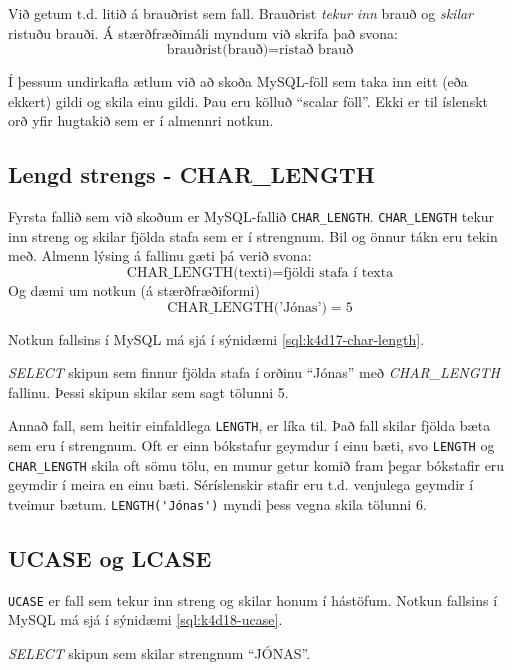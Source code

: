 Við getum t.d. litið á brauðrist sem fall. Brauðrist \emph{tekur inn} brauð og \emph{skilar} ristuðu brauði. Á stærðfræðimáli myndum við skrifa það svona:
\[
\text{brauðrist(brauð)} = \text{ristað brauð}
\]

Í þessum undirkafla ætlum við að skoða MySQL-föll sem taka inn eitt (eða ekkert) gildi og skila einu gildi. Þau eru kölluð ``scalar föll''. Ekki er til íslenskt orð yfir hugtakið sem er í almennri notkun.
\subsection{Lengd strengs - CHAR\_LENGTH}
Fyrsta fallið sem við skoðum er MySQL-fallið \verb|CHAR_LENGTH|. \verb|CHAR_LENGTH| tekur inn streng og skilar fjölda stafa sem er í strengnum. Bil og önnur tákn eru tekin með. Almenn lýsing á fallinu gæti þá verið svona:
\[
\text{CHAR\_LENGTH(texti)} = \text{fjöldi stafa í texta}
\]
Og dæmi um notkun (á stærðfræðiformi)
\[
\text{CHAR\_LENGTH('Jónas')} = 5
\]

Notkun fallsins í MySQL má sjá í sýnidæmi \ref{sql:k4d17-char-length}.

\begin{example}[h]
\caption[CHAR\_LENGTH]{\emph{SELECT} skipun sem finnur fjölda stafa í orðinu ``Jónas'' með \emph{CHAR\_LENGTH} fallinu. Þessi skipun skilar sem sagt tölunni 5.}
\label{sql:k4d17-char-length}
\centering
{}
\end{example}

Annað fall, sem heitir einfaldlega \verb|LENGTH|, er líka til. Það fall skilar fjölda bæta sem eru í strengnum. Oft er einn bókstafur geymdur í einu bæti, svo \verb|LENGTH| og \verb|CHAR_LENGTH| skila oft sömu tölu, en munur getur komið fram þegar bókstafir eru geymdir í meira en einu bæti. Séríslenskir stafir eru t.d. venjulega geymdir í tveimur bætum. \verb|LENGTH('Jónas')| myndi þess vegna skila tölunni $6$. 

\subsection{UCASE og LCASE}
\verb|UCASE| er fall sem tekur inn streng og skilar honum í hástöfum. Notkun fallsins í MySQL má sjá í sýnidæmi \ref{sql:k4d18-ucase}.

\begin{example}[h]
\caption[UCASE]{\emph{SELECT} skipun sem skilar strengnum ``JÓNAS''.}
\label{sql:k4d18-ucase}
\centering
{}
\end{example}

